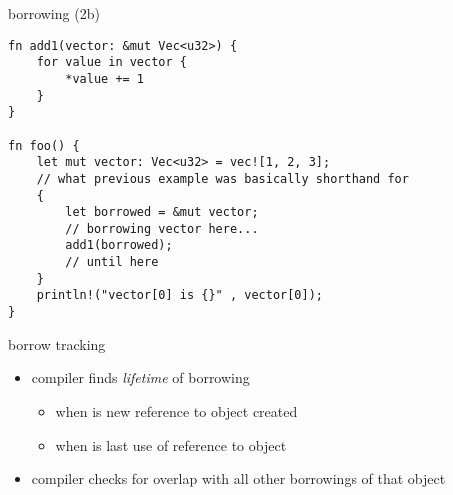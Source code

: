 \begin{frame}[fragile,label=rustBorrowing2b]{borrowing (2b)}
\begin{verbatim}
fn add1(vector: &mut Vec<u32>) {
    for value in vector {
        *value += 1
    }
}

fn foo() {
    let mut vector: Vec<u32> = vec![1, 2, 3];
    // what previous example was basically shorthand for
    {
        let borrowed = &mut vector;
        // borrowing vector here...
        add1(borrowed);
        // until here
    }
    println!("vector[0] is {}" , vector[0]);
}
\end{verbatim}
\end{frame}


\begin{frame}{borrow tracking}
    \begin{itemize}
    \item compiler finds \textit{lifetime} of borrowing
        \begin{itemize}
        \item when is new reference to object created
        \item when is last use of reference to object
        \end{itemize}
    \item compiler checks for overlap with all other borrowings of that object
    \end{itemize}
\end{frame}

